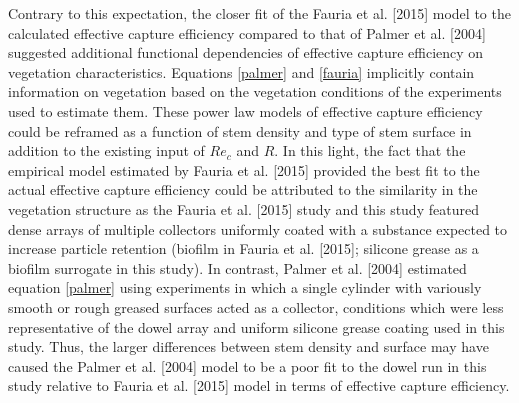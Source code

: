 \documentclass[12pt]{article}
\begin{document}
Contrary to this expectation, the closer fit of the Fauria et al. [2015] model to the calculated effective capture efficiency compared to that of Palmer et al. [2004] suggested additional functional dependencies of effective capture efficiency on vegetation characteristics. Equations \ref{palmer} and \ref{fauria} implicitly contain information on vegetation based on the vegetation conditions of the experiments used to estimate them. These power law models of effective capture efficiency could be reframed as a function of stem density and type of stem surface in addition to the existing input of $Re_c$ and $R$. In this light, the fact that the empirical model estimated by Fauria et al. [2015] provided the best fit to the actual effective capture efficiency could be attributed to the similarity in the vegetation structure as the Fauria et al. [2015] study and this study featured dense arrays of multiple collectors uniformly coated with a substance expected to increase particle retention (biofilm in Fauria et al. [2015]; silicone grease as a biofilm surrogate in this study). In contrast, Palmer et al. [2004] estimated equation \ref{palmer} using experiments in which a single cylinder with variously smooth or rough greased surfaces acted as a collector, conditions which were less representative of the dowel array and uniform silicone grease coating used in this study. Thus, the larger differences between stem density and surface may have caused the Palmer et al. [2004] model to be a poor fit to the dowel run in this study relative to Fauria et al. [2015] model in terms of effective capture efficiency.
\end{document}
